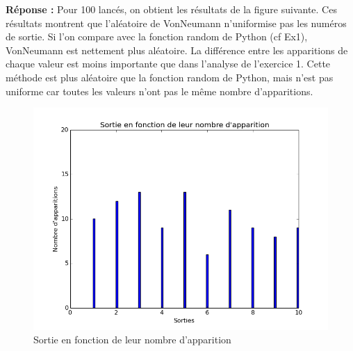 \documentclass[oneside]{book}
\begin{document}
\begin{enumerate}
	\textbf{Réponse :} \newline
	Pour 100 lancés, on obtient les résultats de la figure suivante. Ces résultats montrent que l'aléatoire de VonNeumann n'uniformise pas les numéros de sortie. Si l'on compare avec la fonction random de Python (cf Ex1), VonNeumann est nettement plus aléatoire. La différence entre les apparitions de chaque valeur est moins importante que dans l'analyse de l'exercice 1.\newline
	Cette méthode est plus aléatoire que la fonction random de Python, mais n'est pas uniforme car toutes les valeurs n'ont pas le même nombre d'apparitions.
	\begin{figure}[h!]
		\centering
			\includegraphics[width=\textwidth]{VonNeumann.png}
		\caption{Sortie en fonction de leur nombre d'apparition}
\end{figure}
\end{enumerate}
\end{document}
